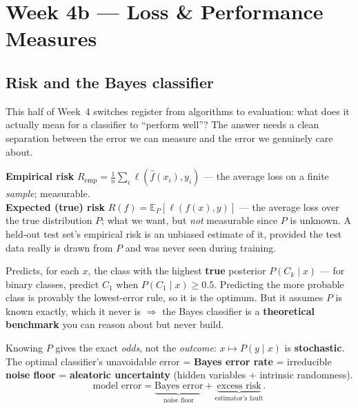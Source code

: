 \documentclass[11pt, a4paper]{article}
\newcommand{\kw}[1]{\textbf{#1}}
\begin{document}
\section{Week 4b — Loss \& Performance Measures}

\subsection{Risk and the Bayes classifier}

This half of Week~4 switches register from algorithms to evaluation: what does it actually mean for a
classifier to ``perform well''? The answer needs a clean separation between the error we can measure
and the error we genuinely care about.

\begin{defbox}
\kw{Empirical risk} $R_{\text{emp}}=\tfrac1n\sum_i\ell(\hat f(x_i),y_i)$ — the average loss on a
finite \emph{sample}; measurable. \\
\kw{Expected (true) risk} $R(f)=\mathbb E_P[\ell(f(x),y)]$ — the average loss over the true
distribution $P$; what we want, but \emph{not} measurable since $P$ is unknown. A held-out test set's
empirical risk is an unbiased estimate of it, provided the test data really is drawn from $P$ and was
never seen during training.
\end{defbox}

\begin{defbox}
Predicts, for each $x$, the class with the highest \kw{true} posterior $P(C_k\mid x)$ — for binary
classes, predict $C_1$ when $P(C_1\mid x)\ge0.5$. Predicting the more probable class is provably the
lowest-error rule, so it is the optimum. But it assumes $P$ is known exactly, which it never is
$\Rightarrow$ the Bayes classifier is a \kw{theoretical benchmark} you can reason about but never
build.
\end{defbox}

\begin{trapbox}
Knowing $P$ gives the exact \emph{odds}, not the \emph{outcome}: $x\mapsto P(y\mid x)$ is
\kw{stochastic}. The optimal classifier's unavoidable error = \kw{Bayes error rate} = irreducible
\kw{noise floor} = \kw{aleatoric uncertainty} (hidden variables + intrinsic randomness).
\[
\text{model error} = \underbrace{\text{Bayes error}}_{\text{noise floor}}
+ \underbrace{\text{excess risk}}_{\text{estimator's fault}}.
\]
\end{trapbox}
\end{document}
